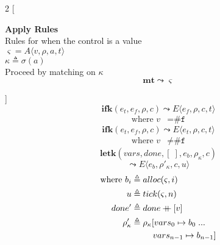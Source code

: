 \documentclass[12pt,draft]{article}
\newcommand\mdoubleplus{\ensuremath{\mathbin{+\mkern-9mu+}}}
\newcommand{\falsesyn}{\texttt{\#f}}
\begin{document}
\newpage


\begin{multicols*}{2}
[
\begin{center}
\textbf{Apply Rules} \\
Rules for when the control is a value \\
$\varsigma = A\langle v , \rho , a , t \rangle$ \\
$\kappa \triangleq \sigma(a)$ \\
Proceed by matching on $\kappa$
\[
\textbf{mt} \leadsto \varsigma
\]
\end{center}
\vspace{-15mm}
]
\[
\textbf{ifk}(e_t, e_f, \rho, c)
\leadsto
E\langle
e_f , \rho , c , t
\rangle
\]
\vspace{-13mm}
\begin{align*}
\text{where } v &= \falsesyn
\end{align*}
\[
\textbf{ifk}(e_t, e_f, \rho, c)
\leadsto
E\langle
e_t , \rho , c , t
\rangle
\]
\vspace{-11mm}
\begin{align*}
\text{where } v &\not= \falsesyn
\end{align*}
\[
\textbf{letk}(vars, done, [\;], e_b , \rho_{\kappa}, c)
\]
\vspace{-7mm}
\[
\leadsto
E\langle
e_b , \rho'_{\kappa} , c , u
\rangle
\]
\vspace{-10mm}
\begin{align*}
\text{where } b_i &\triangleq alloc(\varsigma, i) \\
u &\triangleq tick(\varsigma, n) \\
done' &\triangleq done \mdoubleplus [v] \\
\rho'_{\kappa} &\triangleq \rho_{\kappa}[vars_0 \mapsto b_0\;...\\
&\;\;\;\;\;\;\;\;\;  vars_{n-1} \mapsto b_{n-1}] \\

\end{align*}
\end{multicols*}
\end{document}

